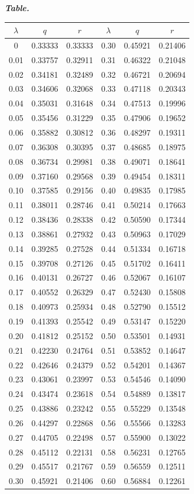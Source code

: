 \begin{center}\textit{\textbf{Table.}}\end{center}
\begingroup\fontsize{9}{11}\selectfont
\begin{center}
\begin{tabular}{c|c|c||c|c|c}
$\lambda$&$q$&$r$&$\lambda$&$q$&$r$\\\hline
0&0.33333&0.33333&0.30&0.45921&0.21406\\
0.01&0.33757&0.32911&0.31&0.46322&0.21048\\
0.02&0.34181&0.32489&0.32&0.46721&0.20694\\
0.03&0.34606&0.32068&0.33&0.47118&0.20343\\
0.04&0.35031&0.31648&0.34&0.47513&0.19996\\
0.05&0.35456&0.31229&0.35&0.47906&0.19652\\[3pt]
0.06&0.35882&0.30812&0.36&0.48297&0.19311\\
0.07&0.36308&0.30395&0.37&0.48685&0.18975\\
0.08&0.36734&0.29981&0.38&0.49071&0.18641\\
0.09&0.37160&0.29568&0.39&0.49454&0.18311\\
0.10&0.37585&0.29156&0.40&0.49835&0.17985\\[3pt]
0.11&0.38011&0.28746&0.41&0.50214&0.17663\\
0.12&0.38436&0.28338&0.42&0.50590&0.17344\\
0.13&0.38861&0.27932&0.43&0.50963&0.17029\\
0.14&0.39285&0.27528&0.44&0.51334&0.16718\\
0.15&0.39708&0.27126&0.45&0.51702&0.16411\\[3pt]
0.16&0.40131&0.26727&0.46&0.52067&0.16107\\
0.17&0.40552&0.26329&0.47&0.52430&0.15808\\
0.18&0.40973&0.25934&0.48&0.52790&0.15512\\
0.19&0.41393&0.25542&0.49&0.53147&0.15220\\
0.20&0.41812&0.25152&0.50&0.53501&0.14931\\[3pt]
0.21&0.42230&0.24764&0.51&0.53852&0.14647\\
0.22&0.42646&0.24379&0.52&0.54201&0.14367\\
0.23&0.43061&0.23997&0.53&0.54546&0.14090\\
0.24&0.43474&0.23618&0.54&0.54889&0.13817\\
0.25&0.43886&0.23242&0.55&0.55229&0.13548\\[3pt]
0.26&0.44297&0.22868&0.56&0.55566&0.13283\\
0.27&0.44705&0.22498&0.57&0.55900&0.13022\\
0.28&0.45112&0.22131&0.58&0.56231&0.12765\\
0.29&0.45517&0.21767&0.59&0.56559&0.12511\\
0.30&0.45921&0.21406&0.60&0.56884&0.12261
\end{tabular}
\end{center}\endgroup

